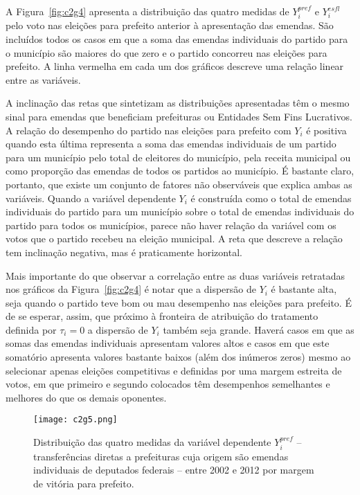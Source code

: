 A Figura~\ref{fig:c2g4} apresenta a distribuição das quatro medidas de $Y_{i}^{pref}$ e $Y_{i}^{esfl}$ pelo voto nas eleições para prefeito anterior à apresentação das emendas. São incluídos todos os casos em que a soma das emendas individuais do partido para o município são maiores do que zero e o partido concorreu nas eleições para prefeito. A linha vermelha em cada um dos gráficos descreve uma relação linear entre as variáveis.

A inclinação das retas que sintetizam as distribuições apresentadas têm o mesmo sinal para emendas que beneficiam prefeituras ou Entidades Sem Fins Lucrativos. A relação do desempenho do partido nas eleições para prefeito com $Y_{i}$ é positiva quando esta última representa a soma das emendas individuais de um partido para um município pelo total de eleitores do município, pela receita municipal ou como proporção das emendas de todos os partidos ao município. É bastante claro, portanto, que existe um conjunto de fatores não observáveis que explica ambas as variáveis. Quando a variável dependente $Y_{i}$ é construída como o total de emendas individuais do partido para um município sobre o total de emendas individuais do partido para todos os municípios, parece não haver relação da variável com os votos que o partido recebeu na eleição municipal. A reta que descreve a relação tem inclinação negativa, mas é praticamente horizontal.

Mais importante do que observar a correlação entre as duas variáveis retratadas nos gráficos da Figura~\ref{fig:c2g4} é notar que a dispersão de $Y_{i}$ é bastante alta, seja quando o partido teve bom ou mau desempenho nas eleições para prefeito. É de se esperar, assim, que próximo à fronteira de atribuição do tratamento definida por $\tau_{i}=0$ a dispersão de $Y_{i}$ também seja grande. Haverá casos em que as somas das emendas individuais apresentam valores altos e casos em que este somatório apresenta valores bastante baixos (além dos inúmeros zeros) mesmo ao selecionar apenas eleições competitivas e definidas por uma margem estreita de votos, em que primeiro e segundo colocados têm desempenhos semelhantes e melhores do que os demais oponentes.

\begin{figure}[htp]
	\centering
	\texttt{[image: c2g5.png]}
	\caption{Distribuição das quatro medidas da variável dependente $Y_{i}^{pref}$ -- transferências diretas a prefeituras cuja origem são emendas individuais de deputados federais -- entre 2002 e 2012 por margem de vitória para prefeito.}
	\label{fig:c2g5}
\end{figure}

